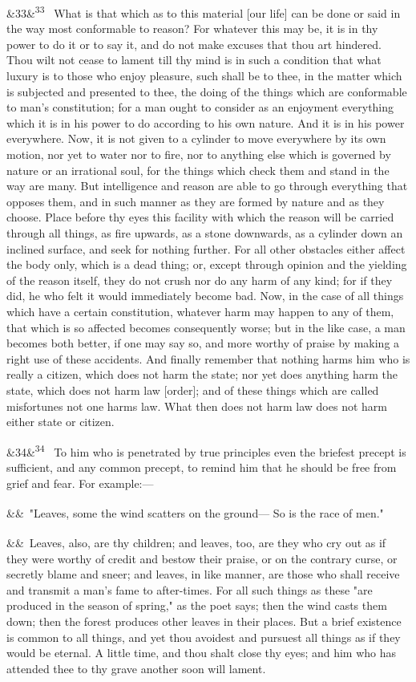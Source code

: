 \documentclass[12pt]{article}
\newcommand{\para}[1][]{\par\noindent\ifx&#1&\else\textsuperscript{\footnotesize #1}~\fi}
\begin{document}
\para[33] What is that which as to this material [our life] can be done or
said in the way most conformable to reason? For whatever this may be, it
is in thy power to do it or to say it, and do not make excuses that thou
art hindered. Thou wilt not cease to lament till thy mind is in such a
condition that what luxury is to those who enjoy pleasure, such shall be
to thee, in the matter which is subjected and presented to thee, the
doing of the things which are conformable to man's constitution; for a
man ought to consider as an enjoyment everything which it is in his
power to do according to his own nature. And it is in his power
everywhere. Now, it is not given to a cylinder to move everywhere by its
own motion, nor yet to water nor to fire, nor to anything else which is
governed by nature or an irrational soul, for the things which check
them and stand in the way are many. But intelligence and reason are able
to go through everything that opposes them, and in such manner as they
are formed by nature and as they choose. Place before thy eyes this
facility with which the reason will be carried through all things, as
fire upwards, as a stone downwards, as a cylinder down an inclined
surface, and seek for nothing further. For all other obstacles either
affect the body only, which is a dead thing; or, except through opinion
and the yielding of the reason itself, they do not crush nor do any harm
of any kind; for if they did, he who felt it would immediately become
bad. Now, in the case of all things which have a certain constitution,
whatever harm may happen to any of them, that which is so affected
becomes consequently worse; but in the like case, a man becomes both
better, if one may say so, and more worthy of praise by making a right
use of these accidents. And finally remember that nothing harms him who
is really a citizen, which does not harm the state; nor yet does
anything harm the state, which does not harm law [order]; and of these
things which are called misfortunes not one harms law. What then does
not harm law does not harm either state or citizen.

\para[34] To him who is penetrated by true principles even the briefest
precept is sufficient, and any common precept, to remind him that he
should be free from grief and fear. For example:---

\para "Leaves, some the wind scatters on the ground---
So is the race of men."

\para Leaves, also, are thy children; and leaves, too, are they who cry out as
if they were worthy of credit and bestow their praise, or on the
contrary curse, or secretly blame and sneer; and leaves, in like manner,
are those who shall receive and transmit a man's fame to after-times.
For all such things as these "are produced in the season of spring," as
the poet says; then the wind casts them down; then the forest produces
other leaves in their places. But a brief existence is common to all
things, and yet thou avoidest and pursuest all things as if they would
be eternal. A little time, and thou shalt close thy eyes; and him who
has attended thee to thy grave another soon will lament.
\end{document}
